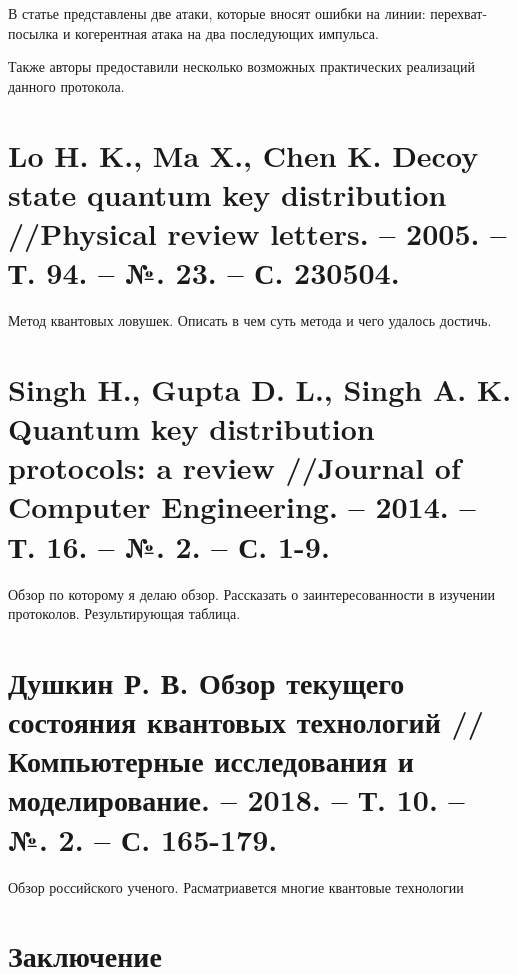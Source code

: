 В статье представлены две атаки, которые вносят ошибки на линии: перехват-посылка и когерентная атака на два последующих импульса.

Также авторы предоставили несколько возможных практических реализаций данного протокола.


\section{Lo H. K., Ma X., Chen K. Decoy state quantum key distribution //Physical review letters. – 2005. – Т. 94. – №. 23. – С. 230504.}
Метод квантовых ловушек. Описать в чем суть метода и чего удалось достичь.


\section{Singh H., Gupta D. L., Singh A. K. Quantum key distribution protocols: a review //Journal of Computer Engineering. – 2014. – Т. 16. – №. 2. – С. 1-9.}
Обзор по которому я делаю обзор. Рассказать о заинтересованности в изучении протоколов. Результирующая таблица.

\section{Душкин Р. В. Обзор текущего состояния квантовых технологий //Компьютерные исследования и моделирование. – 2018. – Т. 10. – №. 2. – С. 165-179.}
Обзор российского ученого.
Расматриавется многие квантовые технологии








\section*{Заключение}
\blindtext


